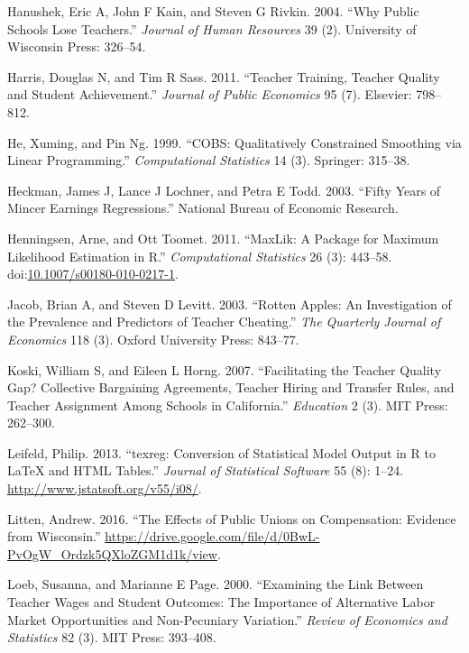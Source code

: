 \documentclass[12pt,]{article}
\begin{document}
\hypertarget{ref-hanushek}{}
Hanushek, Eric A, John F Kain, and Steven G Rivkin. 2004. ``Why Public
Schools Lose Teachers.'' \emph{Journal of Human Resources} 39 (2).
University of Wisconsin Press: 326--54.

\hypertarget{ref-harris}{}
Harris, Douglas N, and Tim R Sass. 2011. ``Teacher Training, Teacher
Quality and Student Achievement.'' \emph{Journal of Public Economics} 95
(7). Elsevier: 798--812.

\hypertarget{ref-he}{}
He, Xuming, and Pin Ng. 1999. ``COBS: Qualitatively Constrained
Smoothing via Linear Programming.'' \emph{Computational Statistics} 14
(3). Springer: 315--38.

\hypertarget{ref-heckman}{}
Heckman, James J, Lance J Lochner, and Petra E Todd. 2003. ``Fifty Years
of Mincer Earnings Regressions.'' National Bureau of Economic Research.

\hypertarget{ref-henningsen}{}
Henningsen, Arne, and Ott Toomet. 2011. ``MaxLik: A Package for Maximum
Likelihood Estimation in R.'' \emph{Computational Statistics} 26 (3):
443--58.
doi:\href{https://doi.org/10.1007/s00180-010-0217-1}{10.1007/s00180-010-0217-1}.

\hypertarget{ref-jacob}{}
Jacob, Brian A, and Steven D Levitt. 2003. ``Rotten Apples: An
Investigation of the Prevalence and Predictors of Teacher Cheating.''
\emph{The Quarterly Journal of Economics} 118 (3). Oxford University
Press: 843--77.

\hypertarget{ref-koski}{}
Koski, William S, and Eileen L Horng. 2007. ``Facilitating the Teacher
Quality Gap? Collective Bargaining Agreements, Teacher Hiring and
Transfer Rules, and Teacher Assignment Among Schools in California.''
\emph{Education} 2 (3). MIT Press: 262--300.

\hypertarget{ref-leifeld}{}
Leifeld, Philip. 2013. ``texreg: Conversion of Statistical Model Output
in R to LaTeX and HTML Tables.'' \emph{Journal of Statistical Software}
55 (8): 1--24. \url{http://www.jstatsoft.org/v55/i08/}.

\hypertarget{ref-litten}{}
Litten, Andrew. 2016. ``The Effects of Public Unions on Compensation:
Evidence from Wisconsin.''
\url{https://drive.google.com/file/d/0BwL-PvOgW_Ordzk5QXloZGM1d1k/view}.

\hypertarget{ref-loeb}{}
Loeb, Susanna, and Marianne E Page. 2000. ``Examining the Link Between
Teacher Wages and Student Outcomes: The Importance of Alternative Labor
Market Opportunities and Non-Pecuniary Variation.'' \emph{Review of
Economics and Statistics} 82 (3). MIT Press: 393--408.
\end{document}
